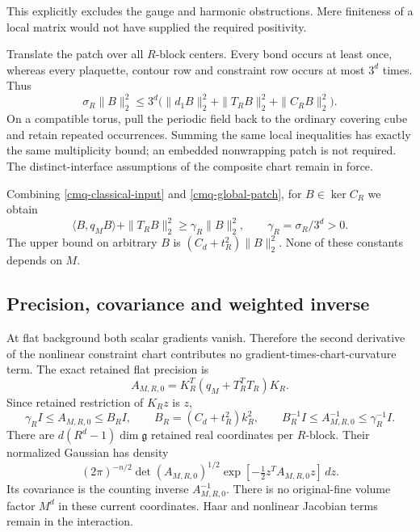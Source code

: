 This explicitly excludes the gauge and harmonic obstructions.
Mere finiteness of a local matrix would not have supplied the
required positivity.

Translate the patch over all $R$-block centers. Every bond occurs
at least once, whereas every plaquette, contour row and
constraint row occurs at most $3^d$ times. Thus
\begin{equation}
 \sigma_R\|B\|_2^2
 \leq3^d\big(\|d_1B\|_2^2+\|T_RB\|_2^2+\|C_RB\|_2^2\big).
 \label{cmq-global-patch}
\end{equation}
On a compatible torus, pull the periodic field back to the
ordinary covering cube and retain repeated occurrences. Summing
the same local inequalities has exactly the same multiplicity
bound; an embedded nonwrapping patch is not required. The
distinct-interface assumptions of the composite chart remain
in force.

Combining \eqref{cmq-classical-input} and
\eqref{cmq-global-patch}, for $B\in\ker C_R$ we obtain
\begin{equation}
 \langle B,q_MB\rangle+\|T_RB\|_2^2
 \geq\gamma_R\|B\|_2^2,\qquad
 \gamma_R=\sigma_R/3^d>0.
 \label{cmq-field-gap}
\end{equation}
The upper bound on arbitrary $B$ is
$(C_d+t_R^2)\|B\|_2^2$. None of these constants depends on $M$.

\subsection{Precision, covariance and weighted inverse}
\label{cmq-inverse-section}

At flat background both scalar gradients vanish. Therefore the
second derivative of the nonlinear constraint chart contributes
no gradient-times-chart-curvature term. The exact retained flat
precision is
\begin{equation}
 A_{M,R,0}=K_R^T(q_M+T_R^TT_R)K_R.
 \label{cmq-flat-precision}
\end{equation}
Since retained restriction of $K_Rz$ is $z$,
\begin{equation}
 \gamma_R I\leq A_{M,R,0}\leq B_R I,\qquad
 B_R=(C_d+t_R^2)k_R^2,\qquad
 B_R^{-1}I\leq A_{M,R,0}^{-1}\leq\gamma_R^{-1}I.
 \label{cmq-sandwich}
\end{equation}
There are $d(R^d-1)\dim\mathfrak g$ retained real coordinates
per $R$-block. Their normalized Gaussian has density
\begin{equation}
 (2\pi)^{-n/2}\det(A_{M,R,0})^{1/2}
        \exp[-\tfrac12 z^TA_{M,R,0}z]\,dz.
 \label{cmq-density}
\end{equation}
Its covariance is the counting inverse $A_{M,R,0}^{-1}$.
There is no original-fine volume factor $M^d$ in these current
coordinates. Haar and nonlinear Jacobian terms remain in the
interaction.

